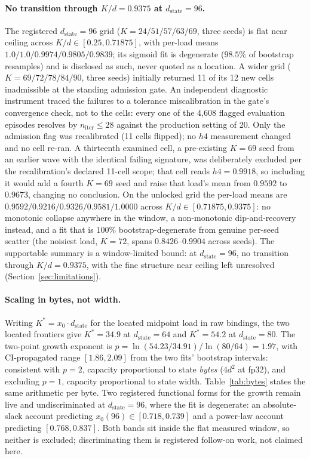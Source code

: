 \paragraph{No transition through $K/d = 0.9375$ at
$d_{\mathrm{state}}=96$.} The registered $d_{\mathrm{state}}=96$ grid
($K = 24/51/57/63/69$, three seeds) is flat near ceiling across
$K/d \in [0.25, 0.71875]$, with per-load means
$1.0/1.0/0.9974/0.9805/0.9839$; its sigmoid fit is degenerate ($98.5\%$
of bootstrap resamples) and is disclosed as such, never quoted as a
location. %
A wider grid ($K = 69/72/78/84/90$, three seeds) initially returned 11 of
its 12 new cells inadmissible at the standing admission gate. An
independent diagnostic instrument traced the failures to a tolerance
miscalibration in the gate's convergence check, not to the cells: every
one of the 4{,}608 flagged evaluation episodes resolves by
$n_{\mathrm{iter}} \le 28$ against the production setting of 20.
Only the admission flag was recalibrated (11 cells flipped); no $h4$
measurement changed and no cell re-ran. %
A thirteenth examined cell, a pre-existing $K{=}69$ seed from an earlier
wave with the identical failing signature, was deliberately excluded per
the recalibration's declared 11-cell scope; that cell reads
$h4 = 0.9918$, so including it would add a fourth $K{=}69$ seed and
raise that load's mean from $0.9592$ to $0.9673$, changing no
conclusion. %
On the unlocked grid the per-load means are
$0.9592/0.9216/0.9326/0.9581/1.0000$ across
$K/d \in [0.71875, 0.9375]$: no monotonic collapse anywhere in the
window, a non-monotonic dip-and-recovery instead, and a fit that is
$100\%$ bootstrap-degenerate from genuine per-seed scatter (the noisiest
load, $K{=}72$, spans $0.8426$--$0.9904$ across seeds). %
The supportable summary is a window-limited bound: at
$d_{\mathrm{state}}=96$, no transition through $K/d = 0.9375$, with the
fine structure near ceiling left unresolved
(Section~\ref{sec:limitations}).

\paragraph{Scaling in bytes, not width.} Writing
$K^{*} = x_0 \cdot d_{\mathrm{state}}$ for the located midpoint load in
raw bindings, the two located frontiers give $K^{*} = 34.9$ at
$d_{\mathrm{state}}=64$ and $K^{*} = 54.2$ at $d_{\mathrm{state}}=80$.
The two-point growth exponent is
$p = \ln(54.23/34.91)/\ln(80/64) = 1.97$, with CI-propagated range
$[1.86, 2.09]$ from the two fits' bootstrap intervals: %
consistent with $p = 2$, capacity proportional to state \emph{bytes}
($4d^2$ at fp32), and excluding $p = 1$, capacity proportional to state
width. Table~\ref{tab:bytes} states the same arithmetic per byte. Two
registered functional forms for the growth remain live and undiscriminated
at $d_{\mathrm{state}}=96$, where the fit is degenerate: an
absolute-slack account predicting $x_0(96) \in [0.718, 0.739]$ and a
power-law account predicting $[0.768, 0.837]$. %
Both bands sit inside the flat measured window, so neither is excluded;
discriminating them is registered follow-on work, not claimed here.


